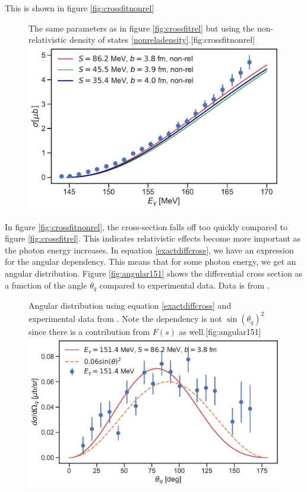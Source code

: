 This is shown in figure \ref{fig:crossfitnonrel}
\begin{figure}[H]
	\begin{sidecaption}{The same parameters as in figure \ref{fig:crossfitrel} but using the non-relativistic density of states \eqref{nonreladensity}.}[fig:crossfitnonrel]
		\includegraphics[width=\linewidth]{Figures/crossfit_nonrel.pdf} 
	\end{sidecaption}
\end{figure}
In figure \ref{fig:crossfitnonrel}, the cross-section falls off too quickly compared to figure \ref{fig:crossfitrel}. This indicates relativistic effects become more important as the photon energy increases. 
In equation \eqref{exactdiffcross}, we have an expression for the angular dependency. This means that for some photon energy, we get an angular distribution. Figure \ref{fig:angular151} shows the differential cross section as a function of the angle $\theta_q$ compared to experimental data. Data is from \cite{BeckPion}.  
\begin{figure}[H]
	\begin{sidecaption}{Angular distribution using equation \eqref{exactdiffcross} and experimental data from \cite{BeckPion}.  Note the dependency is not $\sin(\theta_q)^2$ since there is a contribution from $F(s)$ as well.}[fig:angular151]
		\includegraphics[width=\linewidth]{Figures/DiffCross151_rel.pdf}
	\end{sidecaption}
\end{figure}
